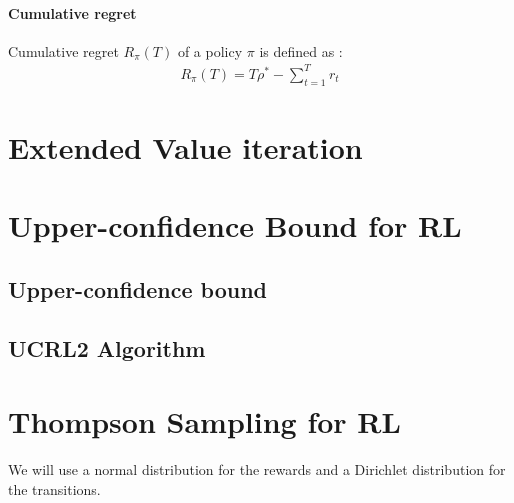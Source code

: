 \documentclass[a4paper,10pt]{article}
\begin{document}
\paragraph{Cumulative regret\\}
Cumulative regret $R_{\pi}(T)$ of a policy $\pi$ is defined as : 
\begin{align*}
R_{\pi}(T) = T\rho^{*} - \sum\limits_{t = 1}^{T} r_t
\end{align*}

\section{Extended Value iteration}

\section{Upper-confidence Bound for RL}
\subsection{Upper-confidence bound}
\subsection{UCRL2 Algorithm}

\section{Thompson Sampling for RL}
We will use a normal distribution for the rewards and a Dirichlet distribution for the transitions. 


\end{document}
